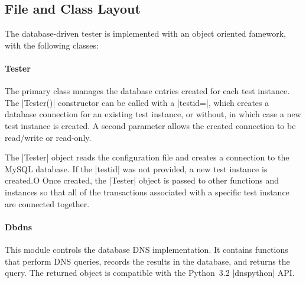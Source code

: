 \documentclass[preprint,3p]{elsarticle}
\begin{document}
\subsection{File and Class Layout}
The database-driven tester is implemented with an object oriented
famework, with the following classes:

\paragraph{Tester} The primary class manages the database entries
created for each test instance. The |Tester()| constructor can be
called with a |testid=|, which creates a database connection for an
existing test instance, or without, in which case a new test instance
is created. A second parameter allows the created connection to be
read/write or read-only.

The |Tester| object reads the configuration file and creates a
connection to the MySQL database. If the |testid| was not provided, a
new test instance is created.O Once created, the |Tester| object is
passed to other functions and instances so that all of the
transactions associated with a specific test instance are connected
together.

\paragraph{Dbdns} This module controls the database DNS
implementation. It contains functions that perform DNS queries,
records the results in the database, and returns the query. The
returned object  is compatible with the Python~3.2 |dnspython| API.
\end{document}
